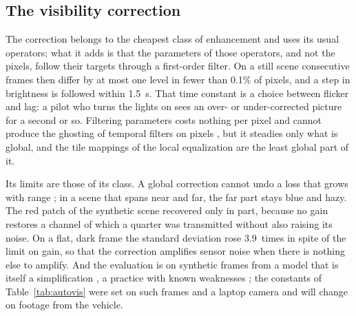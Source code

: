 \subsection{The visibility correction}

The correction belongs to the cheapest class of enhancement and uses its usual
operators; what it adds is that the parameters of those operators, and not the
pixels, follow their targets through a first-order filter. On a still scene
consecutive frames then differ by at most one level in fewer than
0.1\% of pixels,
and a step in brightness is followed within 1.5~s. That time constant
is a choice
between flicker and lag: a pilot who turns the lights on sees an over- or
under-corrected picture for a second or so. Filtering parameters
costs nothing per
pixel and cannot produce the ghosting of temporal filters on pixels
\cite{ancuti2012}, but it steadies only what is global, and the tile
mappings of the
local equalization are the least global part of it.

Its limits are those of its class. A global correction cannot undo a
loss that grows
with range \cite{berman2020}; in a scene that spans near and far, the
far part stays
blue and hazy. The red patch of the synthetic scene recovered only in
part, because
no gain restores a channel of which a quarter was transmitted without
also raising
its noise. On a flat, dark frame the standard deviation rose
3.9~times in spite of
the limit on gain, so that the correction amplifies sensor noise when there is
nothing else to amplify. And the evaluation is on synthetic frames
from a model that
is itself a simplification \cite{akkaynak2018}, a practice with known weaknesses
\cite{berman2020}; the constants of Table~\ref{tab:autovis} were set
on such frames
and a laptop camera and will change on footage from the vehicle.


